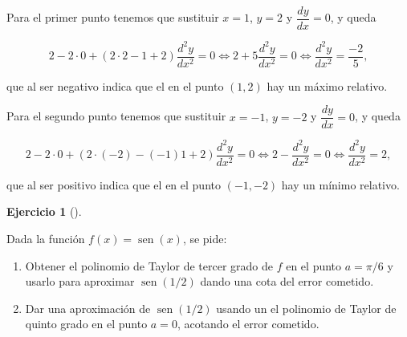 \documentclass[
  spanish,
  a4paper,
]{scrreport}
\providecommand{\tightlist}{%
  \setlength{\itemsep}{0pt}\setlength{\parskip}{0pt}}
\theoremstyle{definition}
\newtheorem{exercise}{Ejercicio}[chapter]
\theoremstyle{remark}
\begin{document}
\begin{tcolorbox}
\begin{enumerate}
  Para el primer punto tenemos que sustituir \(x=1\), \(y=2\) y
  \(\dfrac{dy}{dx}=0\), y queda

  \[
   2-2\cdot 0+(2\cdot 2-1+2)\frac{d^2y}{dx^2}=0 \Leftrightarrow 2+5\frac{d^2y}{dx^2}=0 \Leftrightarrow \frac{d^2y}{dx^2}=\frac{-2}{5},
   \]

  que al ser negativo indica que el en el punto \((1,2)\) hay un máximo
  relativo.

  Para el segundo punto tenemos que sustituir \(x=-1\), \(y=-2\) y
  \(\dfrac{dy}{dx}=0\), y queda

  \[
   2-2\cdot 0+(2\cdot (-2)-(-1)1+2)\frac{d^2y}{dx^2}=0 \Leftrightarrow 2-\frac{d^2y}{dx^2}=0 \Leftrightarrow \frac{d^2y}{dx^2}=2,
   \]

  que al ser positivo indica que el en el punto \((-1,-2)\) hay un
  mínimo relativo.
\end{enumerate}

\end{tcolorbox}

\begin{exercise}[]\protect\hypertarget{exr-taylor-1}{}\label{exr-taylor-1}

Dada la función \(f(x)=\operatorname{sen}(x)\), se pide:

\begin{enumerate}
\def\labelenumi{\alph{enumi}.}
\tightlist
\item
  Obtener el polinomio de Taylor de tercer grado de \(f\) en el punto
  \(a=\pi/6\) y usarlo para aproximar \(\operatorname{sen}(1/2)\) dando
  una cota del error cometido.
\item
  Dar una aproximación de \(\operatorname{sen}(1/2)\) usando un el
  polinomio de Taylor de quinto grado en el punto \(a=0\), acotando el
  error cometido.
\end{enumerate}

\end{exercise}
\end{document}
